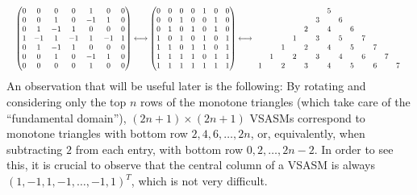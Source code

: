 \documentclass[12pt]{amsart}
\theoremstyle{definition}
\numberwithin{equation}{section}
\begin{document}
\[\resizebox{\linewidth}{!}{$%
\begin{pmatrix}
0 & 0 & 0 & 0 & 1 & 0 & 0 \\
0 & 0 & 1 &0 & -1 & 1 & 0 \\
0 & 1& -1 & 1 & 0 &0 & 0 \\
1 &-1 & 1 &-1 & 1 &-1 & 1 \\
0 & 1 & -1& 1&0 & 0 & 0 \\
0 & 0 & 1 &0&-1 & 1 & 0 \\
0 & 0 & 0 & 0 & 1 & 0 & 0
 \end{pmatrix} 
\longleftrightarrow 
\begin{pmatrix}
0 & 0 & 0 & 0 & 1 & 0 & 0 \\
0 & 0 & 1 &0 & 0 & 1 & 0 \\
0 & 1& 0 & 1 & 0 &1 & 0 \\
1 &0 & 1 &0 & 1 &0 & 1 \\
1 & 1 & 0& 1&1 & 0 & 1 \\
1 & 1 & 1 &1&0 & 1 & 1 \\
1 & 1 & 1 & 1 & 1 & 1 & 1
 \end{pmatrix} 
 \longleftrightarrow 
 \begin{array}{ccccccccccccc}
   &   &   &   &   &   & 5 &   &   &   &   &   &  \\
   &   &   &   &   & 3 &   & 6 &   &   &   &   &  \\
   &   &   &   & 2 &   & 4 &   & 6 &   &   &   &  \\
   &   &   & 1 &   & 3 &   & 5 &   & 7 &   &   &  \\
   &   & 1 &   & 2 &   & 4 &   & 5 &   & 7 &   &  \\
   & 1 &   & 2 &   & 3 &   & 4 &   & 6 &   & 7 &   \\
1  &   & 2 &   & 3 &   & 4 &   & 5 &   & 6 &   & 7 
\end{array}%
$}\]
%
An observation that will be useful later is the following: By rotating and considering only the top $n$ rows of the monotone triangles (which 
take care of the ``fundamental domain''), $(2n+1) \times (2n+1)$ VSASMs correspond to monotone triangles with bottom row 
$2,4,6,\ldots,2n$, or, equivalently, when subtracting $2$ from each entry, with bottom row 
$0,2,\ldots,2n-2$. In order to see this, it is crucial to observe that the central 
column of a VSASM is always $(1,-1,1,-1,\ldots,-1,1)^T$, which is not very difficult.
\end{document}

